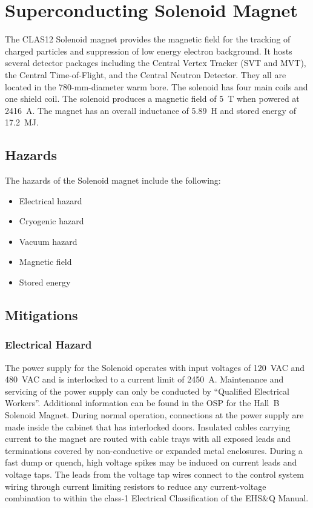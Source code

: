 \section{Superconducting Solenoid Magnet}

The CLAS12 Solenoid magnet provides the magnetic field for the tracking of charged 
particles and suppression of low energy electron background. It hosts several detector 
packages including the Central Vertex Tracker (SVT and MVT), the Central Time-of-Flight, 
and the Central Neutron Detector. They all are located in the 780-mm-diameter warm bore. 
The solenoid has four main coils and one shield coil. The solenoid produces a magnetic 
field of 5~T when powered at 2416~A. The magnet has an overall inductance of 5.89~H and 
stored energy of 17.2~MJ.

\subsection{Hazards} 

The hazards of the Solenoid magnet include the following:

\begin{itemize}
\item Electrical hazard
\item Cryogenic hazard
\item Vacuum hazard
\item Magnetic field
\item Stored energy
\end{itemize}

\subsection{Mitigations}

\subsubsection{Electrical Hazard}

The power supply for the Solenoid operates with input voltages of 120~VAC and 480~VAC and 
is interlocked to a current limit of 2450~A. Maintenance and servicing of the power supply 
can only be conducted by ``Qualified Electrical Workers''. Additional information can be 
found in the OSP for the Hall~B Solenoid Magnet. During normal operation, connections at 
the power supply are made inside the cabinet that has interlocked doors. Insulated cables 
carrying current to the magnet are routed with cable trays with all exposed leads and 
terminations covered by non-conductive or expanded metal enclosures. During a fast dump or 
quench, high voltage spikes may be induced on current leads and voltage taps. The leads from
the voltage tap wires connect to the control system wiring through current limiting resistors 
to reduce any current-voltage combination to within the class-1 Electrical Classification of 
the EHS\&Q Manual.

